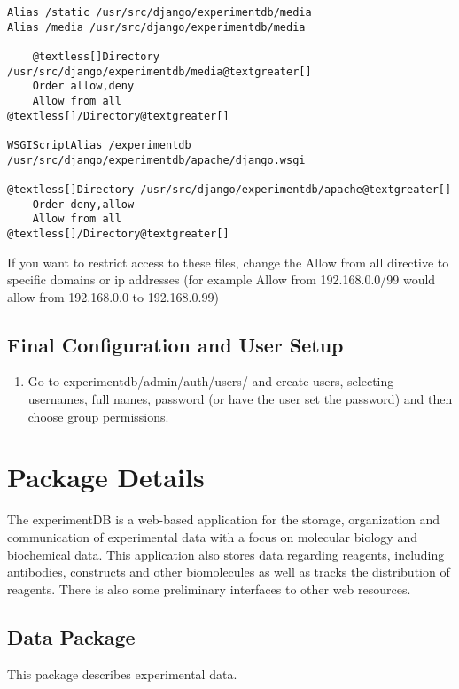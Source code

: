 \documentclass[letterpaper,10pt,english]{sphinxmanual}
\begin{document}
\begin{Verbatim}[commandchars=@\[\]]
Alias /static /usr/src/django/experimentdb/media
Alias /media /usr/src/django/experimentdb/media

    @textless[]Directory /usr/src/django/experimentdb/media@textgreater[]
    Order allow,deny
    Allow from all
@textless[]/Directory@textgreater[]

WSGIScriptAlias /experimentdb /usr/src/django/experimentdb/apache/django.wsgi

@textless[]Directory /usr/src/django/experimentdb/apache@textgreater[]
    Order deny,allow
    Allow from all
@textless[]/Directory@textgreater[]
\end{Verbatim}

If you want to restrict access to these files, change the Allow from all directive to specific domains or ip addresses (for example Allow from 192.168.0.0/99 would allow from 192.168.0.0 to 192.168.0.99)



\section{Final Configuration and User Setup}
\label{installation:final-configuration-and-user-setup}\begin{enumerate}
\item {} 
Go to experimentdb/admin/auth/users/ and create users, selecting usernames, full names, password (or have the user set the password) and then choose group permissions.


\end{enumerate}


\chapter{Package Details}
\label{api:module-experimentdb}\label{api:package-details}\label{api::doc}
The experimentDB is a web-based application for the storage, organization and communication of experimental data with a focus on molecular biology and biochemical data. This application also stores data regarding reagents, including antibodies, constructs and other biomolecules as well as tracks the distribution of reagents. There is also some preliminary interfaces to other web resources.



\section{Data Package}
\label{api:module-experimentdb.data}\label{api:data-package}
This package describes experimental data.
\end{document}
